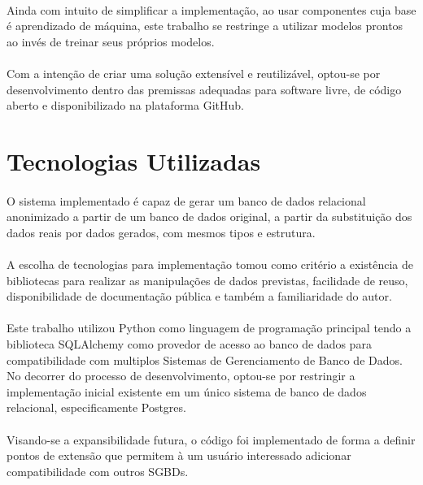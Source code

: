 \paragraph{} Ainda com intuito de simplificar a implementação, ao usar componentes cuja base é aprendizado de máquina, este trabalho se restringe a utilizar modelos prontos ao invés de treinar seus próprios modelos.

\paragraph{} Com a intenção de criar uma solução extensível e reutilizável, optou-se por desenvolvimento dentro das premissas adequadas para software livre, de código aberto e disponibilizado na plataforma GitHub.

\section{Tecnologias Utilizadas}

\paragraph{} O sistema implementado é capaz de gerar um banco de dados relacional anonimizado a partir de um banco de dados original, a partir da substituição dos dados reais por dados gerados, com mesmos tipos e estrutura.

\paragraph{} A escolha de tecnologias para implementação tomou como critério a existência de bibliotecas para realizar as manipulações de dados previstas, facilidade de reuso, disponibilidade de documentação pública e também a familiaridade do autor.

\paragraph{} Este trabalho utilizou Python como linguagem de programação principal tendo a biblioteca SQLAlchemy como provedor de acesso ao banco de dados para compatibilidade com multiplos Sistemas de Gerenciamento de Banco de Dados. No decorrer do processo de desenvolvimento, optou-se por restringir a implementação inicial existente em um único sistema de banco de dados relacional, especificamente Postgres.

\paragraph{} Visando-se a expansibilidade futura, o código foi implementado de forma a definir pontos de extensão que permitem à um usuário interessado adicionar compatibilidade com outros SGBDs.

